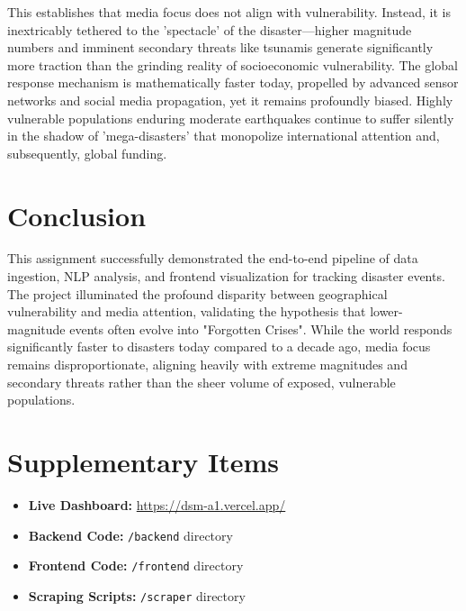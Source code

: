 \documentclass[11pt,a4paper]{article}
\begin{document}
This establishes that media focus does not align with vulnerability. Instead, it is inextricably tethered to the 'spectacle' of the disaster—higher magnitude numbers and imminent secondary threats like tsunamis generate significantly more traction than the grinding reality of socioeconomic vulnerability. The global response mechanism is mathematically faster today, propelled by advanced sensor networks and social media propagation, yet it remains profoundly biased. Highly vulnerable populations enduring moderate earthquakes continue to suffer silently in the shadow of 'mega-disasters' that monopolize international attention and, subsequently, global funding.

\section{Conclusion}
This assignment successfully demonstrated the end-to-end pipeline of data ingestion, NLP analysis, and frontend visualization for tracking disaster events. The project illuminated the profound disparity between geographical vulnerability and media attention, validating the hypothesis that lower-magnitude events often evolve into "Forgotten Crises". While the world responds significantly faster to disasters today compared to a decade ago, media focus remains disproportionate, aligning heavily with extreme magnitudes and secondary threats rather than the sheer volume of exposed, vulnerable populations.

\section{Supplementary Items}
\begin{itemize}
    \item \textbf{Live Dashboard:} \url{https://dsm-a1.vercel.app/}
    \item \textbf{Backend Code:} \texttt{/backend} directory
    \item \textbf{Frontend Code:} \texttt{/frontend} directory
    \item \textbf{Scraping Scripts:} \texttt{/scraper} directory
\end{itemize}
\end{document}
